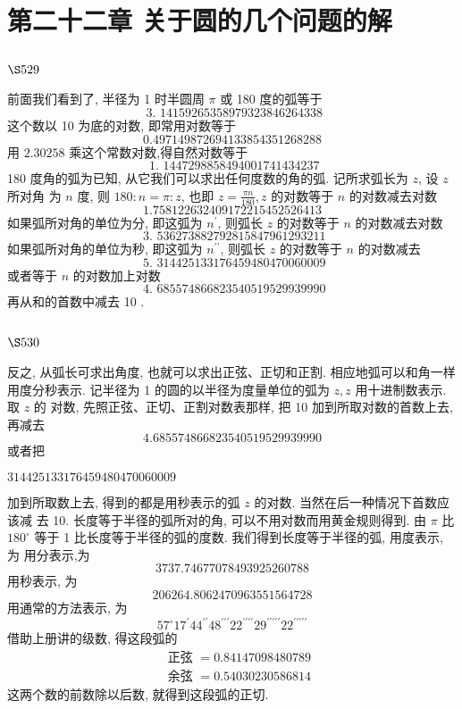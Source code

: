 \chapter{第二十二章 关于圆的几个问题的解}

\section{$\S 529$}

前面我们看到了, 半径为 1 时半圆周 $\pi$ 或 180 度的弧等于
\[
\text { 3. } 14159265358979323846264338
\]
这个数以 10 为底的对数, 即常用对数等于
\[
0.497149872694133854351268288
\]
用 $2.30258$ 乘这个常数对数,得自然对数等于
\[
\text { 1. } 1447298858494001741434237
\]
180 度角的弧为已知, 从它我们可以求出任何度数的角的弧. 记所求弧长为 $z$, 设 $z$ 所对角 为 $n$ 度, 则 $180: n=\pi: z$, 也即 $z=\frac{\pi n}{180}, z$ 的对数等于 $n$ 的对数减去对数
\[
\text { 1.758122632409172215452526413 }
\]
如果弧所对角的单位为分, 即这弧为 $n^{\prime}$, 则弧长 $z$ 的对数等于 $n$ 的对数减去对数
\[
\text { 3. } 536273882792815847961293211
\]
如果弧所对角的单位为秒, 即这弧为 $n^{\prime \prime}$, 则弧长 $z$ 的对数等于 $n$ 的对数减去
\[
\text { 5. } 314425133176459480470060009
\]
或者等于 $n$ 的对数加上对数
\[
\text { 4. } 685574866823540519529939990
\]
再从和的首数中减去 10 .

\section{$\S 530$}

反之, 从弧长可求出角度, 也就可以求出正弦、正切和正割. 相应地弧可以和角一样 用度分秒表示. 记半径为 1 的圆的以半径为度量单位的弧为 $z, z$ 用十进制数表示. 取 $z$ 的 对数, 先照正弦、正切、正割对数表那样, 把 10 加到所取对数的首数上去, 再减去
\[
4. 685574866823540519529939990
\]
或者把

$314425133176459480470060009$

加到所取数上去, 得到的都是用秒表示的弧 $z$ 的对数. 当然在后一种情况下首数应该减 去 10. 长度等于半径的弧所对的角, 可以不用对数而用黄金规则得到. 由 $\pi$ 比 $180^{\circ}$ 等于 1 比长度等于半径的弧的度数. 我们得到长度等于半径的弧, 用度表示, 为 用分表示,为
\[
3737.74677078493925260788
\]
用秒表示, 为
\[
206264.8062470963551564728
\]
用通常的方法表示, 为
\[
57^{\circ} 17^{\prime} 44^{\prime \prime} 48^{\prime \prime \prime} 22^{\prime \prime \prime \prime} 29^{\prime \prime \prime \prime \prime} 22^{\prime \prime \prime \prime \prime}
\]
借助上册讲的级数, 得这段弧的
\[
\begin{aligned}
& \text { 正弦 }=0.84147098480789 \\
& \text { 余弦 }=0.54030230586814
\end{aligned}
\]
这两个数的前数除以后数, 就得到这段弧的正切.

